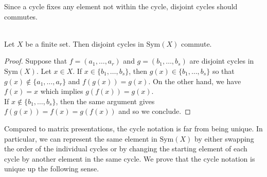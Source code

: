 \documentclass[a4paper]{article}
\begin{document}
Since a cycle fixes any element not within the cycle, disjoint cycles should commutes. 

\begin{prp}{}{}\\
Let $X$ be a finite set. Then disjoint cycles in $\text{Sym}(X)$ commute. 
\begin{proof}
Suppose that $f=(a_1,\dots,a_r)$ and $g=(b_1,\dots,b_s)$ are disjoint cycles in $\text{Sym}(X)$. Let $x\in X$. If $x\in\{b_1,\dots,b_s\}$, then $g(x)\in\{b_1,\dots,b_s\}$ so that $g(x)\notin\{a_1,\dots,a_r\}$ and $f(g(x))=g(x)$. On the other hand, we have $f(x)=x$ which implies $g(f(x))=g(x)$. \\

If $x\notin\{b_1,\dots,b_s\}$, then the same argument gives $f(g(x))=f(x)=g(f(x))$ and so we conclude. 
\end{proof}
\end{prp}

Compared to matrix presentations, the cycle notation is far from being unique. In particular, we can represent the same element in $\text{Sym}(X)$ by either swapping the order of the individual cycles or by changing the starting element of each cycle by another element in the same cycle. We prove that the cycle notation is unique up the following sense. \\
\end{document}
